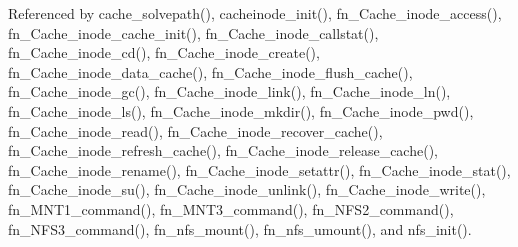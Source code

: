 Referenced by cache\_\-solvepath(), cacheinode\_\-init(), fn\_\-Cache\_\-inode\_\-access(), fn\_\-Cache\_\-inode\_\-cache\_\-init(), fn\_\-Cache\_\-inode\_\-callstat(), fn\_\-Cache\_\-inode\_\-cd(), fn\_\-Cache\_\-inode\_\-create(), fn\_\-Cache\_\-inode\_\-data\_\-cache(), fn\_\-Cache\_\-inode\_\-flush\_\-cache(), fn\_\-Cache\_\-inode\_\-gc(), fn\_\-Cache\_\-inode\_\-link(), fn\_\-Cache\_\-inode\_\-ln(), fn\_\-Cache\_\-inode\_\-ls(), fn\_\-Cache\_\-inode\_\-mkdir(), fn\_\-Cache\_\-inode\_\-pwd(), fn\_\-Cache\_\-inode\_\-read(), fn\_\-Cache\_\-inode\_\-recover\_\-cache(), fn\_\-Cache\_\-inode\_\-refresh\_\-cache(), fn\_\-Cache\_\-inode\_\-release\_\-cache(), fn\_\-Cache\_\-inode\_\-rename(), fn\_\-Cache\_\-inode\_\-setattr(), fn\_\-Cache\_\-inode\_\-stat(), fn\_\-Cache\_\-inode\_\-su(), fn\_\-Cache\_\-inode\_\-unlink(), fn\_\-Cache\_\-inode\_\-write(), fn\_\-MNT1\_\-command(), fn\_\-MNT3\_\-command(), fn\_\-NFS2\_\-command(), fn\_\-NFS3\_\-command(), fn\_\-nfs\_\-mount(), fn\_\-nfs\_\-umount(), and nfs\_\-init().